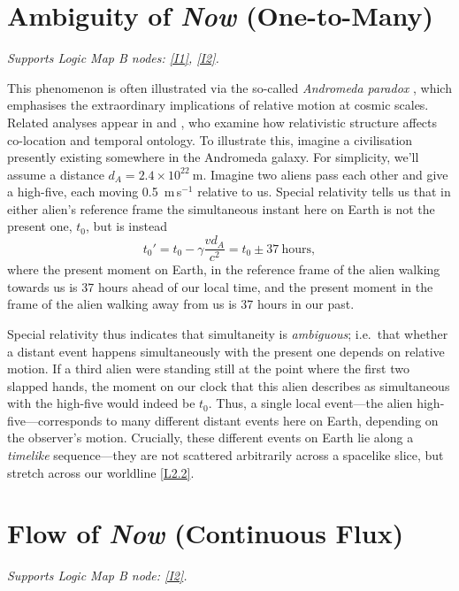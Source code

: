 \documentclass[12pt]{book}
\newcounter{logicanchor}
\newenvironment{logicanchorenv}[1]{\refstepcounter{logicanchor}\label{#1}}{}
\newcommand{\logiclink}[2]{\begin{logicanchorenv}{logic:#1}\end{logicanchorenv}\hyperref[appendix:#1]{[#1]}\xspace}
\begin{document}
\section{Ambiguity of \textit{Now} (One-to-Many)}\label{sec:2.2}
\noindent\textit{Supports Logic Map B nodes: \hyperref[appendix:I1]{[I1]}, \hyperref[appendix:I2]{[I2]}.}

\vspace{4pt}

This phenomenon is often illustrated via the so-called \textit{Andromeda paradox} \citep{penrose1989,price1996}, which emphasises the extraordinary implications of relative motion at cosmic scales. Related analyses appear in \citet{Balashov2000} and \citet{Petkov2005}, who examine how relativistic structure affects co-location and temporal ontology. To illustrate this, imagine a civilisation presently existing somewhere in the Andromeda galaxy. For simplicity, we'll assume a distance $d_A=2.4\times10^{22}~\mathrm{m}$. Imagine two aliens pass each other and give a high-five, each moving 0.5~m\,s$^{-1}$ relative to us. Special relativity tells us that in either alien's reference frame the simultaneous instant here on Earth is not the present one, $t_0$, but is instead
\begin{equation}
    t_0'=t_0-\gamma\frac{vd_A}{c^2}=t_0\pm37~\mathrm{hours},
\end{equation}
where the present moment on Earth, in the reference frame of the alien walking towards us is 37 hours ahead of our local time, and the present moment in the frame of the alien walking away from us is 37 hours in our past.

Special relativity thus indicates that simultaneity is \textit{ambiguous}; i.e.\ that whether a distant event happens simultaneously with the present one depends on relative motion. If a third alien were standing still at the point where the first two slapped hands, the moment on our clock that this alien describes as simultaneous with the high-five would indeed be $t_0$. Thus, a single local event---the alien high-five---corresponds to many different distant events here on Earth, depending on the observer's motion. Crucially, these different events on Earth lie along a \textit{timelike} sequence---they are not scattered arbitrarily across a spacelike slice, but stretch across our worldline \logiclink{L2.2}{}.

\section{Flow of \textit{Now} (Continuous Flux)}\label{sec:2.3}
\noindent\textit{Supports Logic Map B node: \hyperref[appendix:I2]{[I2]}.}
\end{document}
